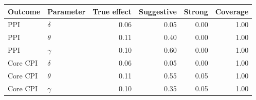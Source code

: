 \begin{tabular}{@{}llrrrr@{}}
\toprule
Outcome & Parameter & True effect & Suggestive & Strong & Coverage \\
\midrule
PPI & $\delta$ & 0.06 & 0.05 & 0.00 & 1.00 \\
PPI & $\theta$ & 0.11 & 0.40 & 0.00 & 1.00 \\
PPI & $\gamma$ & 0.10 & 0.60 & 0.00 & 1.00 \\
Core CPI & $\delta$ & 0.06 & 0.05 & 0.00 & 1.00 \\
Core CPI & $\theta$ & 0.11 & 0.55 & 0.05 & 1.00 \\
Core CPI & $\gamma$ & 0.10 & 0.35 & 0.05 & 1.00 \\
\bottomrule
\end{tabular}

